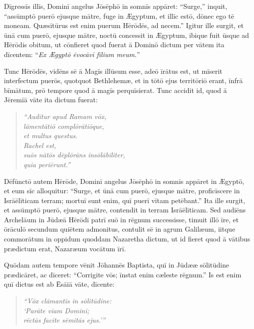 \Versus Dīgressīs illīs, Dominī angelus Jōsēphō in somnīs appāret: ``Surge,'' inquit, ``assūm\-ptō puerō ejusque mātre, fuge in Ægyptum, et illīc estō, dōnec ego tē moneam. Quæsī\-tūrus est enim puerum Hērōdēs, ad necem.'' 
\Versus Igitur ille surgit, et ūnā cum puerō, ejusque mātre, noctū concessit in Ægyptum, 
\Versus ibique fuit ūsque ad Hērōdis obitum, ut cōnfieret quod fuerat ā Dominō dictum per vātem ita dīcentem: ``\emph{Ex Ægyptō ēvocāvī fīlium meum.}''

\Versus Tunc Hērōdēs, vidēns sē ā Magīs illūsum esse, adeō īrātus est, ut mīserit interfectum puerōs, quotquot Bethlehemæ, et in tōtō ejus territōriō erant, īnfrā bīmātum, prō tempore quod ā magīs perquīsierat. 
\Versus Tunc accidit id, quod ā Jēremīā vāte ita dictum fuerat: 

\begin{verse}
\begin{patverse*}
\Versus \emph{``Audītur apud Ramam vōx,\\
lāmentātiō complōrātiōque,\\
et multus questus.\\
Rachel est,\\
suōs nātōs dēplōrāns īnsōlābiliter,\\
quia periērunt.''}
\end{patverse*}
\end{verse}

\Versus Dēfūnctō autem Hērōde, Dominī angelus Jōsēphō in somnīs appāret in Ægyptō, 
\Versus et eum sīc alloquitur: ``Surge, et ūnā cum puerō, ejusque mātre, proficīscere in Isrāēlīticam terram; mortuī sunt enim, quī puerī vītam petēbant.'' 
\Versus Ita ille surgit, et assūmptō puerō, ejusque mātre, contendit in terram Isrāēlīticam. 
\Versus Sed audiēns Archelāum in Jūdæā Hērōdī patrī suō in rēgnum successisse, timuit illō īre, et ōrāculō secundum quiētem admonitus, contulit sē in agrum Galilæum, 
\Versus iitque commorātum in oppidum quoddam Nazaretha dictum, ut id fieret quod ā vātibus prædictum erat, Nazaræum vocātum īrī.
 

\Caput
\Versus Quōdam autem tempore vēnit Jōhannēs Baptista, quī in Jūdææ sōlitūdine prædicāret,
\Versus ac dīceret: ``Corrigite vōs; īnstat enim cæleste rēgnum.''
\Versus Is est enim quī dictus est ab Ēsāiā vāte, dīcente:
\begin{verse}
\begin{patverse*}
\emph{``Vōx clāmantis in sōlitūdine:\\
`Parāte viam Dominī;\\
rēctās facite sēmitās ejus.}'{}''
\end{patverse*}
\end{verse}

